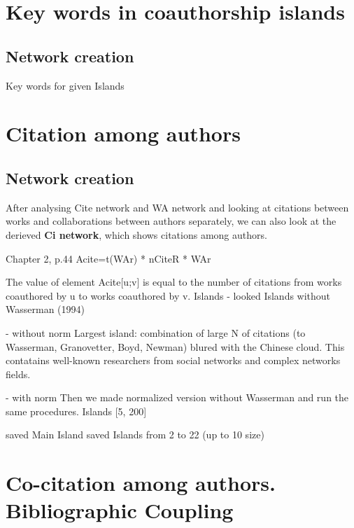 \documentclass[11pt]{article} %
\begin{document}
\section{Key words in coauthorship islands}

\subsection{Network creation}  

Key words for given Islands 


\section{Citation among authors}

\subsection{Network creation} 

After analysing Cite network and WA network and looking at citations between works and collaborations between authors separately, we can also look at the derieved \textbf{Ci network}, which shows citations among authors. 

 \medskip 

Chapter 2, p.44 Acite=t(WAr) * nCiteR * WAr

The value of element Acite[u;v] is equal to the number of citations from works coauthored by u to works coauthored by v.
Islands - looked
Islands without Wasserman (1994) 

- without norm 
Largest island: combination of large N of citations (to Wasserman, Granovetter, Boyd, Newman) blured with the Chinese cloud. This contatains well-known researchers from social networks and complex networks fields.

- with norm 
Then we made normalized version without Wasserman and run the same procedures. Islands [5, 200]

saved Main Island
saved Islands from 2 to 22 (up to 10 size)



\section{Co-citation among authors. Bibliographic Coupling }
\end{document}
